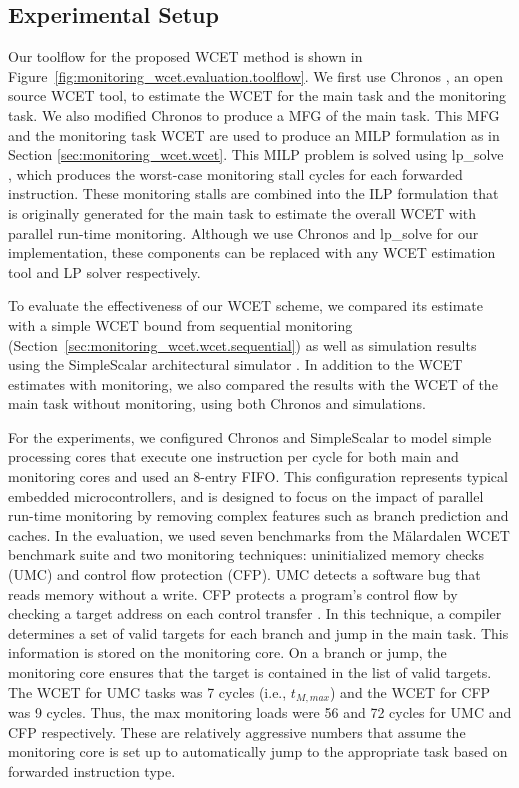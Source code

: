 \subsection{Experimental Setup}

Our toolflow for the proposed WCET method is shown in
Figure~\ref{fig:monitoring_wcet.evaluation.toolflow}. We first use Chronos
\cite{chronos-tool}, an open source WCET tool, to estimate the WCET for the
main task and the monitoring task. We also modified Chronos to produce a MFG
of the main task. This MFG and the monitoring task WCET are used to produce an
MILP formulation as in Section \ref{sec:monitoring_wcet.wcet}. This MILP
problem is solved using lp\_solve \cite{lpsolve}, which produces the worst-case
monitoring stall cycles for each forwarded instruction. These monitoring stalls
are combined into the ILP formulation that is originally generated for the main
task to estimate the overall WCET with parallel run-time monitoring. Although
we use Chronos and lp\_solve for our implementation, these components can be
replaced with any WCET estimation tool and LP solver respectively.

To evaluate the effectiveness of our WCET scheme, we compared its estimate with
a simple WCET bound from sequential monitoring
(Section~\ref{sec:monitoring_wcet.wcet.sequential}) as well as simulation
results using the SimpleScalar architectural simulator \cite{simplescalar}.  In
addition to the WCET estimates with monitoring, we also compared the results
with the WCET of the main task without monitoring, using both Chronos and
simulations. 

For the experiments, we configured Chronos and SimpleScalar to model simple
processing cores that execute one instruction per cycle for both main and
monitoring cores and used an 8-entry FIFO.  This configuration represents
typical embedded microcontrollers, and is designed to focus on the impact of
parallel run-time monitoring by removing complex features such as branch
prediction and caches.  In the evaluation, we used seven benchmarks from the
M\"alardalen WCET benchmark suite \cite{malardalen} and two monitoring
techniques: uninitialized memory checks (UMC) and control flow protection
(CFP).  UMC detects a software bug that reads memory without a write.  CFP
protects a program's control flow by checking a target address on each control
transfer \cite{arora-runtime05}. In this technique, a compiler determines a set
of valid targets for each branch and jump in the main task.  This information
is stored on the monitoring core.  On a branch or jump, the monitoring core
ensures that the target is contained in the list of valid targets.
The WCET for UMC tasks was 7 cycles (i.e., $t_{M,max}$) and the WCET for CFP
was 9 cycles. Thus, the max monitoring loads were 56 and 72 cycles for UMC and
CFP respectively. These are relatively aggressive numbers that assume the
monitoring core is set up to automatically jump to the appropriate task based
on forwarded instruction type.

